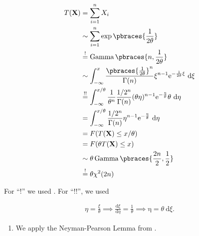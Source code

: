 \begin{solution}
\begin{align*}
    T(\mathbf X)
    & =
    \sum_{i=1}^n
        X_i \\
    & \sim
    \sum_{i=1}^n
        \exp \pbraces{\frac{1}{2 \theta}} \\
    & \stackrel{!}{=}
    \operatorname{Gamma} \pbraces{n, \frac{1}{2 \theta}} \\
    & \sim
    \int_{-\infty}^x
        \frac
        {
            \pbraces{\frac{1}{2 \theta}}^n
        }{
            \Gamma(n)
        }
        \xi^{n-1}
        \mathrm e^{-\frac{1}{2 \theta} \xi}
        ~ \mathrm d \xi \\
    & \stackrel{!!}{=}
    \int_{-\infty}^{x / \theta}
        \frac{1}{\theta^n}
        \frac{1 / 2^n}{\Gamma(n)}
        (\theta \eta)^{n-1}
        \mathrm e^{-\frac{\eta}{\theta}}
        \theta
        ~ \mathrm d \eta \\
    & =
    \int_{-\infty}^{x / \theta}
        \frac{1 / 2^n}{\Gamma(n)}
        \eta^{n-1}
        \mathrm e^{-\frac{\eta}{\theta}}
        ~ \mathrm d \eta \\
    & =
    F(T(\mathbf X) \leq x / \theta) \\
    & =
    F(\theta T(\mathbf X) \leq x) \\
    & \sim
    \theta \operatorname{Gamma} \pbraces{\frac{2 n}{2}, \frac{1}{2}} \\
    & \stackrel{!}{=}
    \theta \chi^2(2 n)
\end{align*}

For \enquote ! we used \cite[section 10, 11]{brand}.
For \enquote{!!}, we used

\begin{align*}
    \eta = \frac{\xi}{\theta}
    \implies
    \frac{\mathrm d \xi}{\mathrm d \eta} = \frac{1}{\theta}
    \implies
    \mathrm \eta = \theta ~ \mathrm d \xi.
\end{align*}

\begin{enumerate}[label = (\alph*)]

    \item We apply the Neyman-Pearson Lemma from \cite[lecture 10, slide 18]{EStat}.
    

\end{enumerate}
\end{solution}
